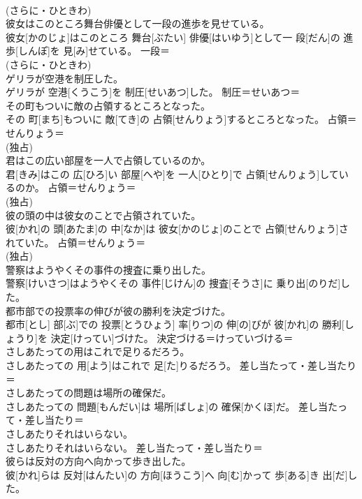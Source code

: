 \documentclass[8pt]{extreport}
\begin{document}
\begin{CJK}{UTF8}{min}
{\\	(さらに・ひときわ) 
\\	彼女はこのところ舞台俳優として一段の進歩を見せている。	
\\	彼女[かのじょ]はこのところ 舞台[ぶたい] 俳優[はいゆう]として一 段[だん]の 進歩[しんぽ]を 見[み]せている。	一段＝ 
\\	(さらに・ひときわ) 
\\	ゲリラが空港を制圧した。	
\\	ゲリラが 空港[くうこう]を 制圧[せいあつ]した。	制圧＝せいあつ＝ 
\\	その町もついに敵の占領するところとなった。	
\\	その 町[まち]もついに 敵[てき]の 占領[せんりょう]するところとなった。	占領＝せんりょう＝ 
\\	(独占) 
\\	君はこの広い部屋を一人で占領しているのか。	
\\	君[きみ]はこの 広[ひろ]い 部屋[へや]を 一人[ひとり]で 占領[せんりょう]しているのか。	占領＝せんりょう＝ 
\\	(独占) 
\\	彼の頭の中は彼女のことで占領されていた。	
\\	彼[かれ]の 頭[あたま]の 中[なか]は 彼女[かのじょ]のことで 占領[せんりょう]されていた。	占領＝せんりょう＝ 
\\	(独占) 
\\	警察はようやくその事件の捜査に乗り出した。	
\\	警察[けいさつ]はようやくその 事件[じけん]の 捜査[そうさ]に 乗り出[のりだ]した。	
\\	都市部での投票率の伸びが彼の勝利を決定づけた。	
\\	都市[とし] 部[ぶ]での 投票[とうひょう] 率[りつ]の 伸[の]びが 彼[かれ]の 勝利[しょうり]を 決定[けってい]づけた。	決定づける＝けっていづける＝ 
\\	さしあたっての用はこれで足りるだろう。	
\\	さしあたっての 用[よう]はこれで 足[た]りるだろう。	差し当たって・差し当たり＝ 
\\	さしあたっての問題は場所の確保だ。	
\\	さしあたっての 問題[もんだい]は 場所[ばしょ]の 確保[かくほ]だ。	差し当たって・差し当たり＝ 
\\	さしあたりそれはいらない。	
\\	さしあたりそれはいらない。	差し当たって・差し当たり＝ 
\\	彼らは反対の方向へ向かって歩き出した。	
\\	彼[かれ]らは 反対[はんたい]の 方向[ほうこう]へ 向[む]かって 歩[ある]き 出[だ]した。	
}
\end{CJK}
\end{document}
